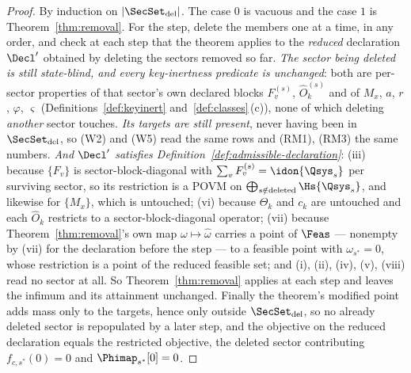 \begin{proof}
By induction on $|\SecSet_{\mathrm{del}}|$. The case $0$ is vacuous and
the case $1$ is Theorem~\ref{thm:removal}. For the step, delete the
members one at a time, in any order, and check at each step that the
theorem applies to the \emph{reduced} declaration
$\Decl'$ obtained by deleting the sectors removed so far.
\emph{The sector being deleted is still state-blind, and every
key-inertness predicate is unchanged}: both are per-sector properties of
that sector's own declared blocks $F^{(s)}_v$, $\hat O^{(s)}_k$ and of
$M_x$, $a$, $r$, $\varphi$, $\varsigma$ (Definitions~\ref{def:keyinert}
and~\ref{def:classes}\,(c)), none of which deleting \emph{another} sector
touches. \emph{Its targets are still present}, never having been in
$\SecSet_{\mathrm{del}}$, so (W2) and (W5) read the same rows and (RM1),
(RM3) the same numbers. \emph{And $\Decl'$ satisfies
Definition~\ref{def:admissible-declaration}}: (iii) because $\{F_v\}$ is sector-block-diagonal
with $\sum_vF^{(s)}_v=\idon{\Qsys_s}$ per surviving sector, so its
restriction is a POVM on $\bigoplus_{s\notin\text{deleted}}\Hs{\Qsys_s}$,
and likewise for $\{M_x\}$, which is untouched; (vi) because $\Theta_k$
and $c_k$ are untouched and each $\hat O_k$ restricts to a
sector-block-diagonal operator; (vii) because Theorem~\ref{thm:removal}'s
own map $\omega\mapsto\hat\omega$ carries a point of $\Feas$ --- nonempty
by (vii) for the declaration before the step --- to a feasible point with
$\omega_{s^{*}}=0$, whose restriction is a point of the reduced feasible
set; and (i), (ii), (iv), (v), (viii) read no sector at all. So
Theorem~\ref{thm:removal} applies at each step and leaves the infimum and
its attainment unchanged. Finally the theorem's modified point adds mass
only to the targets, hence only outside $\SecSet_{\mathrm{del}}$, so no
already deleted sector is repopulated by a later step, and the objective
on the reduced declaration equals the restricted objective, the deleted
sector contributing $f_{\hat c,s^{*}}(0)=0$ and
$\Phimap_{s^{*}}[0]=0$.
\end{proof}
